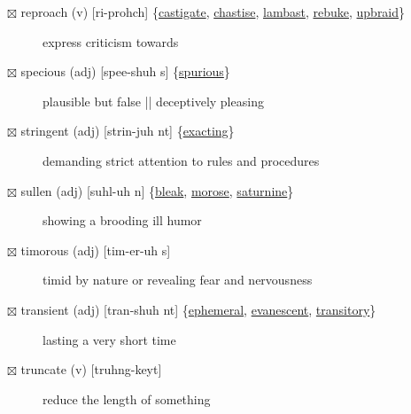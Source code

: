 \documentclass[11pt]{article}
\begin{document}
\begin{description}
\item[{$\boxtimes$ \label{org3cb95b6}reproach (v) [ri-prohch] \{\hyperref[org41ed9c5]{castigate}, \hyperref[org578f0de]{chastise}, \hyperref[orgcb82180]{lambast}, \hyperref[org05472f9]{rebuke}, \hyperref[org6b90e9e]{upbraid}\}}] express criticism towards
\item[{$\boxtimes$ \label{org1e6d6a7}specious (adj) [spee-shuh s] \{\hyperref[org712564a]{spurious}\}}] plausible but false || deceptively pleasing
\item[{$\boxtimes$ \label{orgab990a0}stringent (adj) [strin-juh nt] \{\hyperref[org7c24807]{exacting}\}}] demanding strict attention to rules and procedures
\item[{$\boxtimes$ sullen (adj) [suhl-uh n] \{\hyperref[org37831d4]{bleak}, \hyperref[orge33fcaf]{morose}, \hyperref[orgb873785]{saturnine}\}}] showing a brooding ill humor
\item[{$\boxtimes$ timorous (adj) [tim-er-uh s]}] timid by nature or revealing fear and nervousness
\item[{$\boxtimes$ \label{orgb67ac3b}transient (adj) [tran-shuh nt] \{\hyperref[org70165c8]{ephemeral}, \hyperref[orgf68fa16]{evanescent}, \hyperref[org51c6a20]{transitory}\}}] lasting a very short time
\item[{$\boxtimes$ truncate (v) [truhng-keyt]}] reduce the length of something
\end{description}
\end{document}
